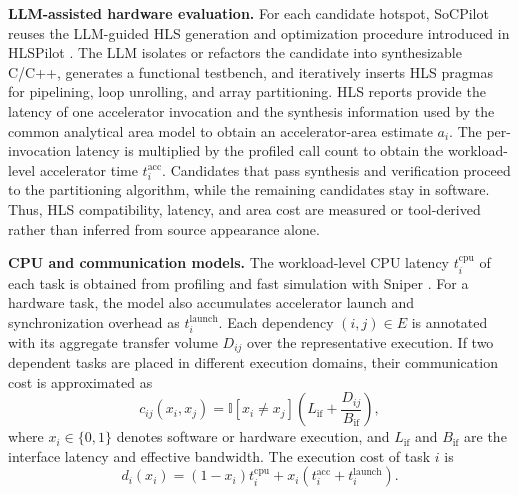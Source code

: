 \textbf{LLM-assisted hardware evaluation.}
For each candidate hotspot, SoCPilot reuses the LLM-guided HLS generation and optimization procedure introduced in HLSPilot \cite{xiong2024hlspilot}. The LLM isolates or refactors the candidate into synthesizable C/C++, generates a functional testbench, and iteratively inserts HLS pragmas for pipelining, loop unrolling, and array partitioning. HLS reports provide the latency of one accelerator invocation and the synthesis information used by the common analytical area model to obtain an accelerator-area estimate $a_i$. The per-invocation latency is multiplied by the profiled call count to obtain the workload-level accelerator time $t_i^{\mathrm{acc}}$. Candidates that pass synthesis and verification proceed to the partitioning algorithm, while the remaining candidates stay in software. Thus, HLS compatibility, latency, and area cost are measured or tool-derived rather than inferred from source appearance alone.

\textbf{CPU and communication models.}
The workload-level CPU latency $t_i^{\mathrm{cpu}}$ of each task is obtained from profiling and fast simulation with Sniper \cite{sniper}. For a hardware task, the model also accumulates accelerator launch and synchronization overhead as $t_i^{\mathrm{launch}}$. Each dependency $(i,j)\in E$ is annotated with its aggregate transfer volume $D_{ij}$ over the representative execution. If two dependent tasks are placed in different execution domains, their communication cost is approximated as
\begin{equation}
c_{ij}(x_i,x_j)=
\mathbb{I}[x_i\neq x_j]\left(L_{\mathrm{if}}+\frac{D_{ij}}{B_{\mathrm{if}}}\right),
\end{equation}
where $x_i\in\{0,1\}$ denotes software or hardware execution, and $L_{\mathrm{if}}$ and $B_{\mathrm{if}}$ are the interface latency and effective bandwidth. The execution cost of task $i$ is
\begin{equation}
d_i(x_i)=(1-x_i)t_i^{\mathrm{cpu}}+
x_i\left(t_i^{\mathrm{acc}}+t_i^{\mathrm{launch}}\right).
\end{equation}

